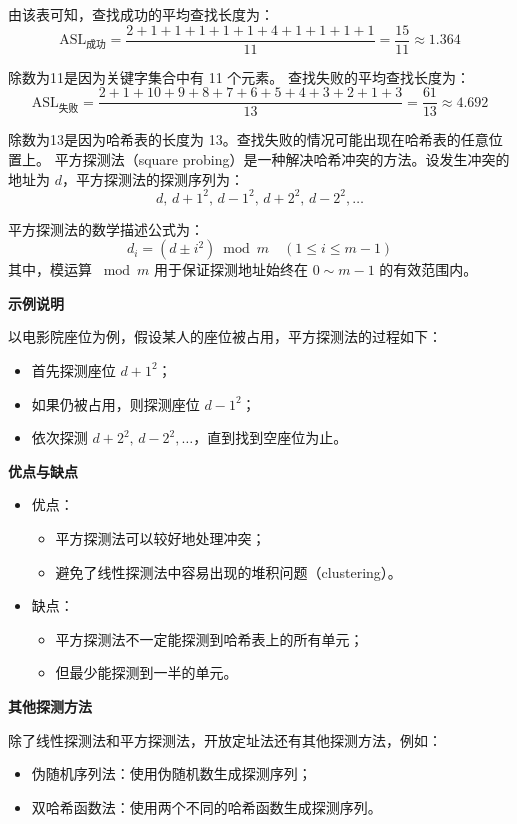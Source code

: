 \documentclass[lang=cn,newtx,10pt,scheme=chinese]{../elegantbook}
\begin{document}
由该表可知，查找成功的平均查找长度为：
\[
\text{ASL}_{\text{成功}} = \frac{2 + 1 + 1 + 1 + 1 + 1 + 4 + 1 + 1 + 1 + 1}{11} = \frac{15}{11} \approx 1.364
\]

除数为11是因为关键字集合中有 11 个元素。
查找失败的平均查找长度为：
\[
\text{ASL}_{\text{失败}} = \frac{2 + 1 + 10 + 9 + 8 + 7 + 6 + 5 + 4 + 3 + 2 + 1 + 3}{13} = \frac{61}{13} \approx  4.692
\]

除数为13是因为哈希表的长度为 13。查找失败的情况可能出现在哈希表的任意位置上。
平方探测法（square probing）是一种解决哈希冲突的方法。设发生冲突的地址为 $d$，平方探测法的探测序列为：
\[
d, \, d+1^2, \, d-1^2, \, d+2^2, \, d-2^2, \dots
\]

平方探测法的数学描述公式为：
\[
d_i = (d \pm i^2) \bmod m \quad (1 \leq i \leq m-1)
\]
其中，模运算 $\bmod m$ 用于保证探测地址始终在 $0 \sim m-1$ 的有效范围内。


\textbf{示例说明} 

以电影院座位为例，假设某人的座位被占用，平方探测法的过程如下：
\begin{itemize}
  \item 首先探测座位 $d+1^2$；
  \item 如果仍被占用，则探测座位 $d-1^2$；
  \item 依次探测 $d+2^2, \, d-2^2, \dots$，直到找到空座位为止。
\end{itemize}


\textbf{优点与缺点}  

\begin{itemize}
  \item 优点：  
    \begin{itemize}
      \item 平方探测法可以较好地处理冲突；
      \item 避免了线性探测法中容易出现的堆积问题（clustering）。
    \end{itemize}
  \item 缺点：  
    \begin{itemize}
      \item 平方探测法不一定能探测到哈希表上的所有单元；
      \item 但最少能探测到一半的单元。
    \end{itemize}
\end{itemize}


\textbf{其他探测方法}  

除了线性探测法和平方探测法，开放定址法还有其他探测方法，例如：
\begin{itemize}
  \item 伪随机序列法：使用伪随机数生成探测序列；
  \item 双哈希函数法：使用两个不同的哈希函数生成探测序列。
\end{itemize}
\end{document}
